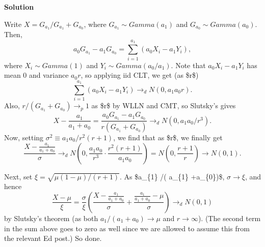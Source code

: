 \documentclass[
  letterpaper,
  DIV=11,
  numbers=noendperiod]{scrreprt}
\theoremstyle{definition}
\theoremstyle{plain}
\theoremstyle{remark}
\begin{document}
\begin{tcolorbox}[enhanced jigsaw, bottomrule=.15mm, opacityback=0, arc=.35mm, breakable, left=2mm, colframe=quarto-callout-tip-color-frame, toprule=.15mm, rightrule=.15mm, leftrule=.75mm, colback=white]
\begin{minipage}[t]{5.5mm}
\textcolor{quarto-callout-tip-color}{\faLightbulb}
\end{minipage}%
\begin{minipage}[t]{\textwidth - 5.5mm}

\textbf{Solution}\vspace{2mm}

Write \(\displaystyle X=G_{a_{1}} /G_{a_{1}} +G_{a_{0}}\), where
\(\displaystyle G_{a_{1}} \sim Gamma( a_{1})\) and
\(\displaystyle G_{a_{0}} \sim Gamma( a_{0})\). Then, \[
\begin{equation*}
a_{0} G_{a_{1}} -a_{1} G_{a_{0}} =\sum _{i=1}^{a_{1}}( a_{0} X_{i} -a_{1} Y_{i}) ,
\end{equation*}
\] where \(\displaystyle X_{i} \sim Gamma( 1)\) and
\(\displaystyle Y_{i} \sim Gamma( a_{0} /a_{1})\). Note that
\(\displaystyle a_{0} X_{i} -a_{1} Y_{i}\) has mean 0 and variance
\(\displaystyle a_{0} r\), so applying iid CLT, we get (as
\$\displaystyle r\rightarrow \infty \$) \[
\begin{equation*}
\sum _{i=1}^{a_{1}}( a_{0} X_{i} -a_{1} Y_{i})\rightarrow _{d} N( 0,a_{1} a_{0} r) .
\end{equation*}
\] Also, \(\displaystyle r/( G_{a_{1}} +G_{a_{0}})\rightarrow _{p} 1\)
as \$\displaystyle r\rightarrow \infty \$ by WLLN and CMT, so Slutsky's
gives \[
\begin{equation*}
X-\frac{a_{1}}{a_{1} +a_{0}} =\frac{a_{0} G_{a_{1}} -a_{1} G_{a_{0}}}{r( G_{a_{1}} +G_{a_{0}})}\rightarrow _{d} N\left( 0,a_{1} a_{0} /r^{3}\right) .
\end{equation*}
\] Now, setting
\(\displaystyle \sigma ^{2} \equiv a_{1} a_{0} /r^{2}( r+1)\), we find
that as \$\displaystyle r\rightarrow \infty \$, we finally get \[
\begin{equation*}
\frac{X-\frac{a_{1}}{a_{1} +a_{0}}}{\sigma }\rightarrow _{d} N\left( 0,\frac{a_{1} a_{0}}{r^{3}} \cdot \frac{r^{2}( r+1)}{a_{1} a_{0}}\right) =N\left( 0,\frac{r+1}{r}\right)\rightarrow N( 0,1) .
\end{equation*}
\]

Next, set \(\displaystyle \xi =\sqrt{\mu ( 1-\mu ) /( r+1)}\). As
\$\displaystyle a\_\{1\} /( a\_\{1\} +a\_\{0\})\rightarrow \mu \$,
\(\displaystyle \sigma \rightarrow \xi\), and hence \[
\begin{equation*}
\frac{X-\mu }{\xi } =\frac{\sigma }{\xi }\left(\frac{X-\frac{a_{1}}{a_{1} +a_{0}}}{\sigma } +\frac{\frac{a_{1}}{a_{1} +a_{0}} -\mu }{\sigma }\right)\rightarrow _{d} N( 0,1)
\end{equation*}
\] by Slutsky's theorem (as both
\(\displaystyle a_{1} /( a_{1} +a_{0})\rightarrow \mu\) and
\(\displaystyle r\rightarrow \infty\)). (The second term in the sum
above goes to zero as well since we are allowed to assume this from the
relevant Ed post.) So done.

\end{minipage}%
\end{tcolorbox}
\end{document}
